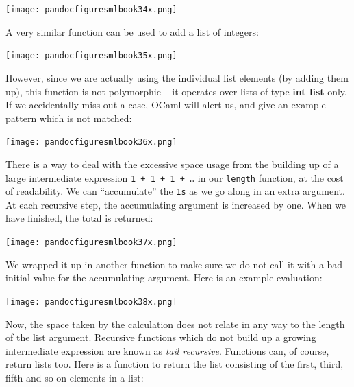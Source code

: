 \documentclass[]{book}
\newcommand{\smspace}{\vspace{4mm}}
\begin{document}
\medskip
\begin{center}
\noindent\texttt{[image: pandocfiguresmlbook34x.png]}
\end{center}
\medskip
\smspace

\noindent A very similar function can be used to add a list of integers:

\medskip
\begin{center}
\noindent\texttt{[image: pandocfiguresmlbook35x.png]}
\end{center}
\medskip
\smspace

\noindent However, since we are actually using the individual list elements (by adding them up), this function is not polymorphic -- it operates over lists of type \textbf{\textsf{int list}} only. If we accidentally miss out a case, OCaml will alert us, and give an example pattern which is not matched:

\medskip
\begin{center}
\noindent\texttt{[image: pandocfiguresmlbook36x.png]}
\end{center}
\medskip
\smspace

\noindent There is a way to deal with the excessive space usage from the  building up of a large intermediate expression \texttt{1 + 1 + 1 + \ldots} in our \texttt{length} function, at the cost of readability. We can ``accumulate'' the \texttt{1s} as we go along in an extra argument. At each recursive step, the  accumulating argument is increased by one. When we have finished, the total is returned: 

\medskip
\begin{center}
\noindent\texttt{[image: pandocfiguresmlbook37x.png]}
\end{center}
\medskip
\smspace

\noindent We wrapped it up in another function to make sure we do not call it with a bad initial value for the accumulating argument. Here is an example evaluation:

\medskip
\begin{center}
\noindent\texttt{[image: pandocfiguresmlbook38x.png]}
\end{center}
\medskip
\smspace

\noindent Now, the space taken by the calculation does not relate in any way to the length of the list argument. Recursive functions which do not build up a growing intermediate expression are known as \textit{tail recursive}. Functions can, of course, return lists too. Here is a function to return the list consisting of the first, third, fifth and so on elements in a list:
\end{document}
